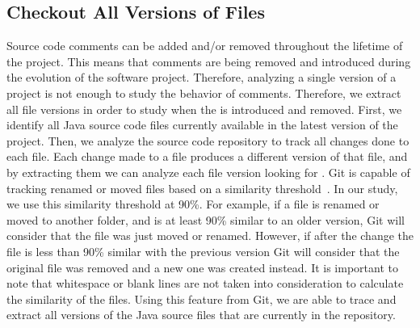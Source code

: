 \subsection{Checkout All Versions of Files}
\label{sub:checkout_all_versions_of_files}




Source code comments can be added and/or removed throughout the lifetime of the project. This means that \SATD comments are being removed and introduced during the evolution of the software project. Therefore, analyzing a single version of a project is not enough to study the behavior of \SATD comments. Therefore, we extract all file versions in order to study when the \SATD is introduced and removed. First, we identify all Java source code files currently available in the latest version of the project. Then, we analyze the source code repository to track all changes done to each file. Each change made to a file produces a different version of that file, and by extracting them we can analyze each file version looking for \SATD. Git is capable of tracking renamed or moved files based on a similarity threshold~\cite{BirdMSR2009,HataIWPSE-EVOL2011}. In our study, we use this similarity threshold at 90\%. For example, if a file is renamed or moved to another folder, and is at least 90\% similar to an older version, Git will consider that the file was just moved or renamed. However, if after the change the file is less than 90\% similar with the previous version Git will consider that the original file was removed and a new one was created instead. It is important to note that whitespace or blank lines are not taken into consideration to calculate the similarity of the files. Using this feature from Git, we are able to trace and extract all versions of the Java source files that are currently in the repository. 

